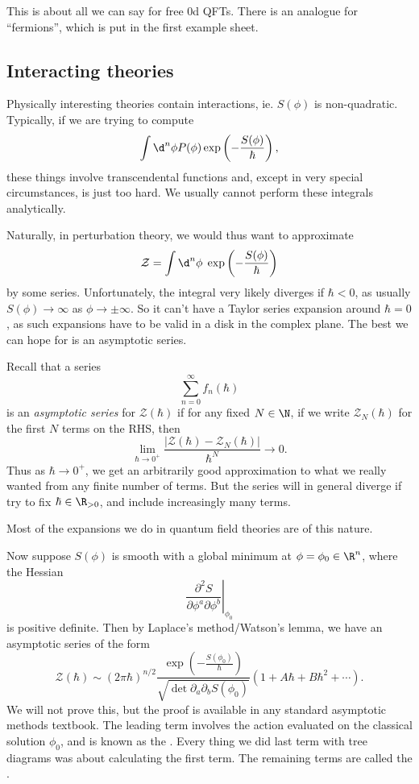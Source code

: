 \documentclass[a4paper]{article}
\begin{document}
This is about all we can say for free 0d QFTs. There is an analogue for ``fermions'', which is put in the first example sheet.

\subsection{Interacting theories}
Physically interesting theories contain interactions, ie. $S(\phi)$ is non-quadratic. Typically, if we are trying to compute
\[
  \int \d^n \phi P(\phi) \exp\left(-\frac{S(\phi)}{\hbar}\right),
\]
these things involve transcendental functions and, except in very special circumstances, is just too hard. We usually cannot perform these integrals analytically.

Naturally, in perturbation theory, we would thus want to approximate
\[
  \mathcal{Z} = \int \d^n \phi\; \exp\left(-\frac{S(\phi)}{\hbar}\right)
\]
by some series. Unfortunately, the integral very likely diverges if $\hbar < 0$, as usually $S(\phi) \to \infty$ as $\phi \to \pm\infty$. So it can't have a Taylor series expansion around $\hbar = 0$, as such expansions have to be valid in a disk in the complex plane. The best we can hope for is an asymptotic series.

Recall that a series
\[
  \sum_{n = 0}^\infty f_n(\hbar)
\]
is an \emph{asymptotic series} for $\mathcal{Z}(\hbar)$ if for any fixed $N \in \N$, if we write $\mathcal{Z}_N(\hbar)$ for the first $N$ terms on the RHS, then
\[
  \lim_{\hbar \to 0^+} \frac{|\mathcal{Z}(\hbar) - \mathcal{Z}_N(\hbar)|}{\hbar^N} \to 0.
\]
Thus as $\hbar \to 0^+$, we get an arbitrarily good approximation to what we really wanted from any finite number of terms. But the series will in general diverge if try to fix $\hbar \in \R_{> 0}$, and include increasingly many terms.

Most of the expansions we do in quantum field theories are of this nature.

Now suppose $S(\phi)$ is smooth with a global minimum at $\phi = \phi_0 \in \R^n$, where the Hessian
\[
  \left.\frac{\partial^2 S}{\partial \phi^a \partial \phi^b}\right|_{\phi_0}
\]
is positive definite. Then by Laplace's method/Watson's lemma, we have an asymptotic series of the form
\[
  \mathcal{Z}(\hbar) \sim (2\pi \hbar)^{n/2} \frac{\exp\left(-\frac{S(\phi_0)}{\hbar}\right)}{\sqrt{\det \partial_a \partial_b S(\phi_0)}} \left(1 + A \hbar + B \hbar^2 + \cdots\right).
\]
We will not prove this, but the proof is available in any standard asymptotic methods textbook. The leading term involves the action evaluated on the classical solution $\phi_0$, and is known as the . Every thing we did last term with tree diagrams was about calculating the first term. The remaining terms are called the .
\end{document}
